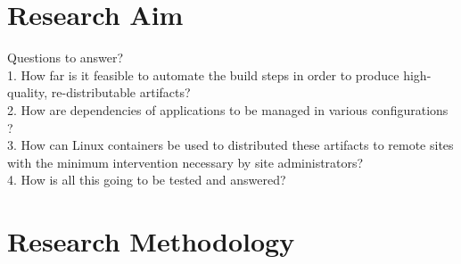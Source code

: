 \documentclass [titlepage,11pt]{article}
\begin{document}

\section{Research Aim}
Questions to answer? \\
1. How far is it feasible to automate the build steps in order to produce high-quality, re-distributable artifacts? \\
2. How are dependencies of applications to be managed in various configurations ? \\
3. How can Linux containers be used to distributed these artifacts to remote sites with the minimum intervention necessary by site administrators? \\
4. How is all this going to be tested and answered? 

\section{Research Methodology}

\end{document}
